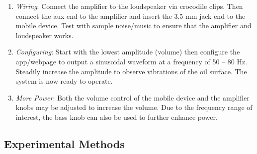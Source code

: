 \begin{enumerate}
\item  \textit{Wiring}: Connect the amplifier to the loudspeaker via crocodile clips. Then connect the aux end to the amplifier and insert the 3.5 mm jack end to the mobile device. Test with sample noise/music to ensure that the amplifier and loudspeaker works.

\item  \textit{Configuring}: Start with the lowest amplitude (volume) then configure the app/webpage to output a sinusoidal waveform at a frequency of 50 – 80 Hz. Steadily increase the amplitude to observe vibrations of the oil surface. The system is now ready to operate.

\item  \textit{More Power}: Both the volume control of the mobile device and the amplifier knobs may be adjusted to increase the volume. Due to the frequency range of interest, the bass knob can also be used to further enhance power.

\end{enumerate}


\subsection{Experimental Methods}

